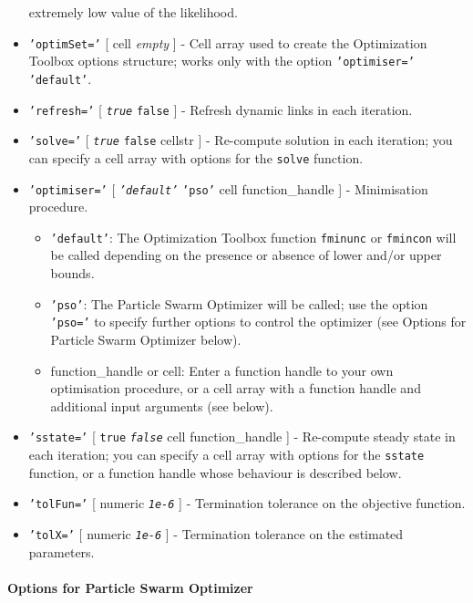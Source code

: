\begin{itemize}
  extremely low value of the likelihood.
\item
  \texttt{'optimSet='} {[} cell \textbar{} \emph{empty} {]} - Cell array
  used to create the Optimization Toolbox options structure; works only
  with the option \texttt{'optimiser='} \texttt{'default'}.
\item
  \texttt{'refresh='} {[} \emph{\texttt{true}} \textbar{} \texttt{false}
  {]} - Refresh dynamic links in each iteration.
\item
  \texttt{'solve='} {[} \emph{\texttt{true}} \textbar{} \texttt{false}
  \textbar{} cellstr {]} - Re-compute solution in each iteration; you
  can specify a cell array with options for the \texttt{solve} function.
\item
  \texttt{'optimiser='} {[} \emph{\texttt{'default'}} \textbar{}
  \texttt{'pso'} \textbar{} cell \textbar{} function\_handle {]} -
  Minimisation procedure.

  \begin{itemize}
  \item
    \texttt{'default'}: The Optimization Toolbox function
    \texttt{fminunc} or \texttt{fmincon} will be called depending on the
    presence or absence of lower and/or upper bounds.
  \item
    \texttt{'pso'}: The Particle Swarm Optimizer will be called; use the
    option \texttt{'pso='} to specify further options to control the
    optimizer (see Options for Particle Swarm Optimizer below).
  \item
    function\_handle or cell: Enter a function handle to your own
    optimisation procedure, or a cell array with a function handle and
    additional input arguments (see below).
  \end{itemize}
\item
  \texttt{'sstate='} {[} \texttt{true} \textbar{} \emph{\texttt{false}}
  \textbar{} cell \textbar{} function\_handle {]} - Re-compute steady
  state in each iteration; you can specify a cell array with options for
  the \texttt{sstate} function, or a function handle whose behaviour is
  described below.
\item
  \texttt{'tolFun='} {[} numeric \textbar{} \emph{\texttt{1e-6}} {]} -
  Termination tolerance on the objective function.
\item
  \texttt{'tolX='} {[} numeric \textbar{} \emph{\texttt{1e-6}} {]} -
  Termination tolerance on the estimated parameters.
\end{itemize}

\paragraph{Options for Particle Swarm
Optimizer}\label{options-for-particle-swarm-optimizer}

